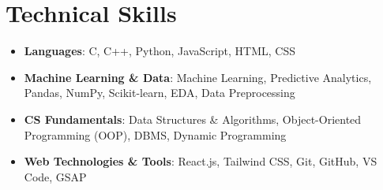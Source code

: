 \documentclass[11pt,a4paper]{article}
\begin{document}
\section{Technical Skills}
\vspace{2pt}
\begin{itemize}[leftmargin=0.15in, label={}, itemsep=1pt]
    \item \small{\textbf{Languages}{: C, C++, Python, JavaScript, HTML, CSS}}
    \item \small{\textbf{Machine Learning \& Data}{: Machine Learning, Predictive Analytics, Pandas, NumPy, Scikit-learn, EDA, Data Preprocessing}}
    \item \small{\textbf{CS Fundamentals}{: Data Structures \& Algorithms, Object-Oriented Programming (OOP), DBMS, Dynamic Programming}}
    \item \small{\textbf{Web Technologies \& Tools}{: React.js, Tailwind CSS, Git, GitHub, VS Code, GSAP}}
\end{itemize}

\end{document}
